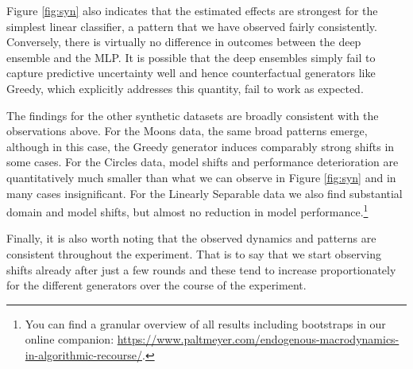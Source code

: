\documentclass[conference,final,]{IEEEtran}
\theoremstyle{definition}
\theoremstyle{definition}
\theoremstyle{definition}
\theoremstyle{definition}
\theoremstyle{remark}
\begin{document}
Figure \ref{fig:syn} also indicates that the estimated effects are strongest for the simplest linear classifier, a pattern that we have observed fairly consistently. Conversely, there is virtually no difference in outcomes between the deep ensemble and the MLP. It is possible that the deep ensembles simply fail to capture predictive uncertainty well and hence counterfactual generators like Greedy, which explicitly addresses this quantity, fail to work as expected.

The findings for the other synthetic datasets are broadly consistent with the observations above. For the Moons data, the same broad patterns emerge, although in this case, the Greedy generator induces comparably strong shifts in some cases. For the Circles data, model shifts and performance deterioration are quantitatively much smaller than what we can observe in Figure \ref{fig:syn} and in many cases insignificant. For the Linearly Separable data we also find substantial domain and model shifts, but almost no reduction in model performance.\footnote{You can find a granular overview of all results including bootstraps in our online companion: \url{https://www.paltmeyer.com/endogenous-macrodynamics-in-algorithmic-recourse/}.}

Finally, it is also worth noting that the observed dynamics and patterns are consistent throughout the experiment. That is to say that we start observing shifts already after just a few rounds and these tend to increase proportionately for the different generators over the course of the experiment.
\end{document}
